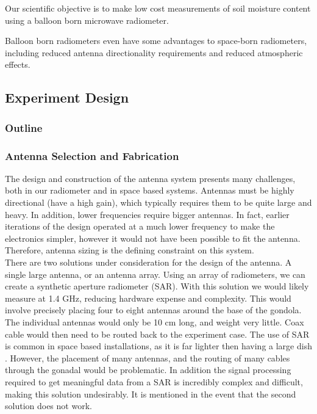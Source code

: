 \documentclass[12pt]{article}
\begin{document}
 Our scientific objective is to make low cost measurements of soil moisture content using a balloon born microwave radiometer. 

Balloon born radiometers even have some advantages to space-born radiometers, including reduced antenna directionality requirements and reduced atmospheric effects.

 
\subsection{Experiment Design}
\subsubsection{Outline}

\subsubsection{Antenna Selection and Fabrication}
The design and construction of the antenna system presents many challenges, both in our radiometer and in space 
based systems. Antennas must be highly directional (have a high gain), which typically requires them to be quite large and heavy. In addition, lower frequencies require bigger antennas. In fact, earlier iterations of the design 
operated at a much lower frequency to make the electronics simpler, however it would not have been possible to fit
the antenna. Therefore, antenna sizing is the defining constraint on this system.\\

There are two solutions under consideration for the design of the antenna. A single large antenna, or an antenna 
array. Using an array of radiometers, we can create a synthetic aperture radiometer (SAR). With this solution we
would likely measure at 1.4 GHz, reducing hardware expense and complexity. This would involve precisely placing
four to eight antennas around the base of the gondola. The individual antennas would only be 10 cm long, and
weight very little. Coax cable would then need to be routed back to the experiment case. The use of SAR is common
in space based installations, as it is far lighter then having a large dish \cite{skou1989microwave}. 
However, the placement of many antennas, and the routing of many cables through the gonadal would be 
problematic. In addition the signal processing required to get meaningful data from a SAR is incredibly complex
and difficult, making this solution undesirably. It is mentioned in the event that the second solution does 
not work.\\
\end{document}
